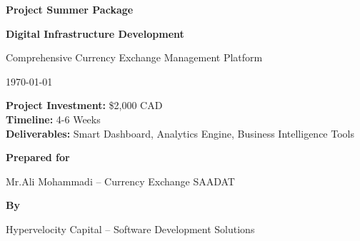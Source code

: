 \documentclass[11pt, letterpaper]{article}
\begin{document}
\begin{titlepage}
    \centering
    \vspace*{2cm}

    \vspace{2cm}
    {\Huge\bfseries\color{techBlue} Project Summer Package\par}
    \vspace{1cm}
    {\Large\bfseries Digital Infrastructure Development\par}
    \vspace{0.3cm}
    {\large\color{darkGray} Comprehensive Currency Exchange Management Platform\par}
    \vspace{0.5cm}
    {\large \today\par}
    \vfill

    \begin{tcolorbox}[colback=lightGray, colframe=techBlue, width=0.8\textwidth, center]
        \centering
        \textbf{\large Project Investment:} \$2,000 CAD\\[0.3cm]
        \textbf{\large Timeline:} 4-6 Weeks\\[0.3cm]
        \textbf{\large Deliverables:} Smart Dashboard, Analytics Engine, Business Intelligence Tools
    \end{tcolorbox}

    {\Large\bfseries Prepared for\par}
{\large Mr.Ali Mohammadi -- Currency Exchange SAADAT\par}
\vspace{0.5cm}

    \vspace{1cm}
    {\Large\bfseries By\par}
    {\large  Hypervelocity Capital\texttrademark{} -- Software Development Solutions\par}
    \vspace{2cm}

\end{titlepage}

\tableofcontents
\thispagestyle{fancy}
\newpage
\end{document}

